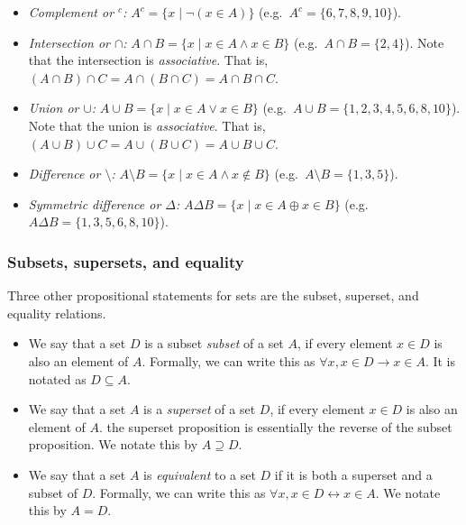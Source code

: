 \begin{itemize}
\item
  \emph{Complement or \(^c\):} \(A^c = \{ x \mid \lnot(x \in A) \}\)
  (e.g.~\(A^c = \{6, 7, 8, 9, 10\}\)).
\item
  \emph{Intersection or \(\cap\):}
  \(A \cap B = \{x \mid x \in A \land x \in B\}\)
  (e.g.~\(A \cap B = \{2,4\}\)). Note that the intersection is
  \emph{associative}. That is,
  \((A \cap B) \cap C = A \cap (B \cap C) = A \cap B \cap C\).
\item
  \emph{Union or \(\cup\):}
  \(A \cup B = \{x \mid x \in A \lor x \in B\}\)
  (e.g.~\(A \cup B = \{1,2,3,4,5,6,8,10\}\)). Note that the union is
  \emph{associative}. That is,
  \((A \cup B) \cup C = A \cup (B \cup C) = A \cup B \cup C\).
\item
  \emph{Difference or \(\setminus\):}
  \(A \setminus B = \{x \mid x \in A \land x \not\in B\}\)
  (e.g.~\(A \setminus B = \{1,3,5\}\)).
\item
  \emph{Symmetric difference or \(\Delta\):}
  \(A \Delta B = \{x \mid x \in A \oplus x \in B\}\)
  (e.g.~\(A \Delta B = \{1,3,5,6,8,10\}\)).
\end{itemize}

\hypertarget{subsets-supersets-and-equality}{%
\subsubsection{Subsets, supersets, and
equality}\label{subsets-supersets-and-equality}}

Three other propositional statements for sets are the subset, superset,
and equality relations.

\begin{itemize}
\tightlist
\item
  We say that a set \(D\) is a subset \emph{subset} of a set \(A\), if
  every element \(x \in D\) is also an element of \(A\). Formally, we
  can write this as \(\forall x, x \in D \to x \in A\). It is notated as
  \(D \subseteq A\).
\item
  We say that a set \(A\) is a \emph{superset} of a set \(D\), if every
  element \(x \in D\) is also an element of \(A\). the superset
  proposition is essentially the reverse of the subset proposition. We
  notate this by \(A \supseteq D\).
\item
  We say that a set \(A\) is \emph{equivalent} to a set \(D\) if it is
  both a superset and a subset of \(D\). Formally, we can write this as
  \(\forall x, x\in D \leftrightarrow x \in A\). We notate this by
  \(A = D\).
\end{itemize}

